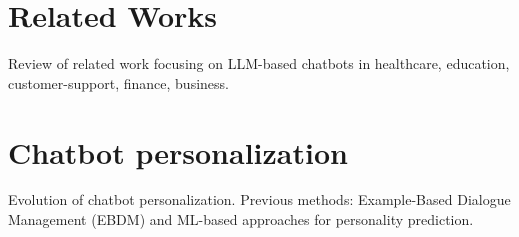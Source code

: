 \section{Related Works}
Review of related work focusing on LLM-based chatbots in healthcare, education, customer-support, finance, business.

\section{Chatbot personalization}
Evolution of chatbot personalization. Previous methods: Example-Based Dialogue Management (EBDM) and ML-based approaches for personality prediction.
